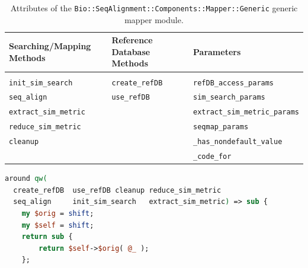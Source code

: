 \documentclass[10pt]{article}
\begin{document}
\begin{table}[!h]\centering
\caption[Table caption text]{Attributes of the \texttt{Bio::SeqAlignment::Components::Mapper::Generic} generic mapper module. }
	\begin{tabularx}{1.0\textwidth}{Y|Y|Y}
\toprule
Searching/Mapping Methods       & Reference Database Methods  & Parameters\\
\midrule\\
\texttt{init\_sim\_search}      & \texttt{create\_refDB}      & \texttt{refDB\_access\_params}\\
\texttt{seq\_align}             & \texttt{use\_refDB}         & \texttt{sim\_search\_params}\\
\texttt{extract\_sim\_metric}   &                             & \texttt{extract\_sim\_metric\_params}\\
\texttt{reduce\_sim\_metric}    &                             & \texttt{seqmap\_params}\\
\texttt{cleanup}                &                             & \texttt{\_has\_nondefault\_value}\\                       
\texttt{ }                      &                             & \texttt{\_code\_for}\\
\bottomrule
 \end{tabularx}
\label{tab:GenericMapperModule}
\end{table}

\noindent\hspace{0.00\linewidth}\begin{minipage}{1.0\textwidth}
\begin{lstlisting}[language=Perl,basicstyle=\footnotesize,frame=none,caption={Around modification of the methods of the generic mapper module.},label={lst:AroundModifier},captionpos=b]
around qw(
  create_refDB  use_refDB cleanup reduce_sim_metric 
  seq_align     init_sim_search   extract_sim_metric) => sub {
    my $orig = shift;
    my $self = shift;
    return sub {
        return $self->$orig( @_ );
    };
\end{lstlisting}
\end{minipage}
\end{document}
